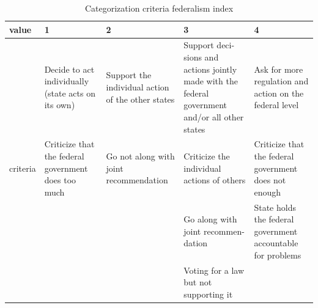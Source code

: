\begin{table}[h]
	\caption{Categorization criteria federalism index} \label{tbl:PPI}
	\begin{center}
		\renewcommand{\arraystretch}{2}
		\begin{tabular}{  m{1.5cm} | m{3cm} | m{3cm} | m{3cm} | m{3cm} } \toprule 
			value & 1 & 2 & 3 & 4 \\ \midrule 
			& Decide to act individually (state acts on its own) & Support the individual action of the other states & Support deci-sions and actions jointly made with the federal government and/or all other states & Ask for more regulation and action on the federal level \\
			criteria & Criticize that the federal government does too much & Go not along with joint recommendation & Criticize the individual actions of others & Criticize that the federal government does not enough \\
			&  &  & Go along with joint recommen-dation & State holds the federal government accountable for problems \\
			&  &  & Voting for a law but not supporting it &  \\ \bottomrule 
		\end{tabular}
	\end{center}
	\label{tb.PPI}
\end{table}